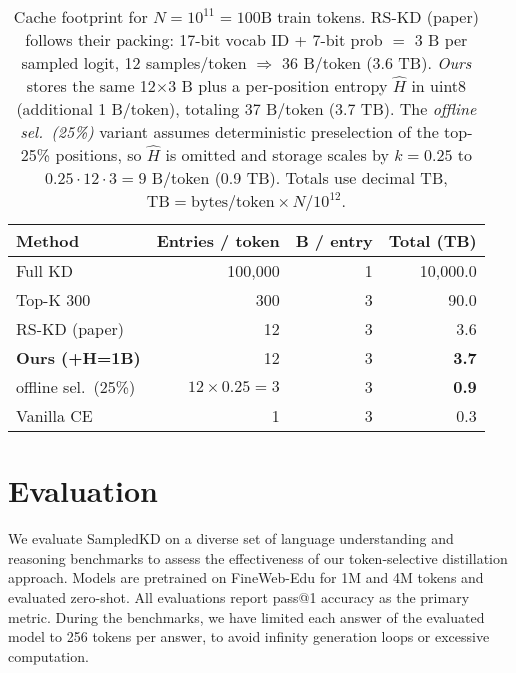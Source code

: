 \documentclass[11pt]{article}
\begin{document}
\begin{table}[h]
	\centering
	\begin{adjustbox}{max width=\linewidth}
		\begin{tabular}{lrrr}
			\toprule
			Method                    & Entries / token          & B / entry & Total (TB)   \\
			\midrule
			Full KD                   & 100{,}000                & 1         & 10{,}000.0   \\
			Top-K 300                 & 300                      & 3         & 90.0         \\
			RS-KD (paper)             & 12                       & 3         & 3.6          \\
			\textbf{Ours (+H=1B)}     & 12                       & 3         & \textbf{3.7} \\
			\quad offline sel.~(25\%) & $12 \!\times\! 0.25 = 3$ & 3         & \textbf{0.9} \\
			Vanilla CE                & 1                        & 3         & 0.3          \\
			\bottomrule
		\end{tabular}
	\end{adjustbox}
	\caption{Cache footprint for $N{=}10^{11}{=}100\text{B}$ train tokens. RS-KD (paper) follows their packing: 17-bit vocab ID + 7-bit prob $=$ 3 B per sampled logit, 12 samples/token $\Rightarrow$ 36 B/token (3.6 TB). \textit{Ours} stores the same 12$\times$3 B plus a per-position entropy $\hat H$ in uint8 (additional 1 B/token), totaling 37 B/token (3.7 TB). The \textit{offline sel.~(25\%)} variant assumes deterministic preselection of the top-25\% positions, so $\hat H$ is omitted and storage scales by $k{=}0.25$ to $0.25{\cdot}12{\cdot}3{=}9$ B/token (0.9 TB). Totals use decimal TB, $\mathrm{TB}=\text{bytes/token}\times N/10^{12}$.}
	\label{tab:storage}
\end{table}

\section{Evaluation}
\label{sec:evaluation}

We evaluate SampledKD on a diverse set of language understanding and reasoning benchmarks to assess the effectiveness of our token-selective distillation approach.
Models are pretrained on FineWeb-Edu for 1M and 4M tokens and evaluated zero-shot.
All evaluations report pass@1 accuracy as the primary metric.
During the benchmarks, we have limited each answer of the evaluated model to 256 tokens per answer, to avoid infinity generation loops or excessive computation.
\end{document}

